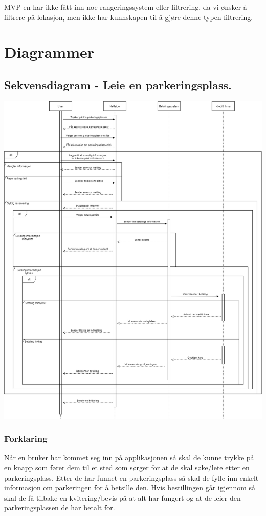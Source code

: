 \documentclass[12pt]{article}
\begin{document}
    MVP-en har ikke fått inn noe rangeringssystem eller filtrering, da vi ønsker å filtrere på lokasjon, men ikke har kunnskapen til å gjøre denne typen filtrering.

\section{Diagrammer}
    \subsection{Sekvensdiagram - Leie en parkeringsplass.}
    \includegraphics[max width=\textwidth]{bilder/diagrammer/sekvens_leietaker.png}
            \subsubsection{Forklaring}
            Når en bruker har kommet seg inn på applikasjonen så skal de kunne trykke på en knapp som fører dem til et sted som sørger for at de skal søke/lete etter en parkeringsplass. Etter de har funnet en parkeringsplass så skal de fylle inn enkelt informasjon om parkeringen for å betsille den. Hvis bestillingen går igjennom så skal de få tilbake en kvitering/bevis på at alt har fungert og at de leier den parkeringsplassen de har betalt for.
\end{document}
